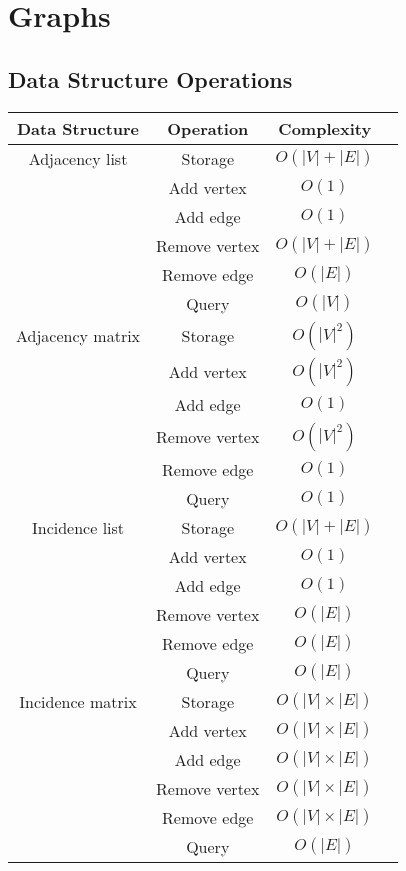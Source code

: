 \documentclass{article}
\begin{document}
\newpage
\section*{Graphs}
\subsection*{Data Structure Operations}

\begin{table}[ht]
	\centering
	\scriptsize
	\begin{tabular}{cccc}
		\textbf{Data Structure} & \textbf{Operation} & \textbf{Complexity} \\
		\hline
		Adjacency list & Storage &  $O(|V|+|E|)$  \\
		& Add vertex & $O(1)$  \\
		& Add edge & $O(1)$  \\
		& Remove vertex & $O(|V|+|E|)$  \\
		& Remove edge & $O(|E|)$  \\
		& Query & $O(|V|)$  \\
		\hline
		Adjacency matrix & Storage & $O(|V|^2)$  \\
		& Add vertex & $O(|V|^2)$  \\
		& Add edge & $O(1)$  \\
		& Remove vertex & $O(|V|^2)$  \\
		& Remove edge & $O(1)$  \\
		& Query & $O(1)$  \\
		\hline
		Incidence list & Storage &  $O(|V|+|E|)$  \\
		& Add vertex & $O(1)$  \\
		& Add edge & $O(1)$  \\
		& Remove vertex & $O(|E|)$  \\
		& Remove edge & $O(|E|)$  \\
		& Query & $O(|E|)$  \\
		\hline
		Incidence matrix & Storage &  $O(|V|\times|E|)$  \\
		& Add vertex & $O(|V|\times|E|)$  \\
		& Add edge & $O(|V|\times|E|)$  \\
		& Remove vertex & $O(|V|\times|E|)$  \\
		& Remove edge & $O(|V|\times|E|)$  \\
		& Query & $O(|E|)$  \\
		\hline
	\end{tabular}
\end{table}
\end{document}
